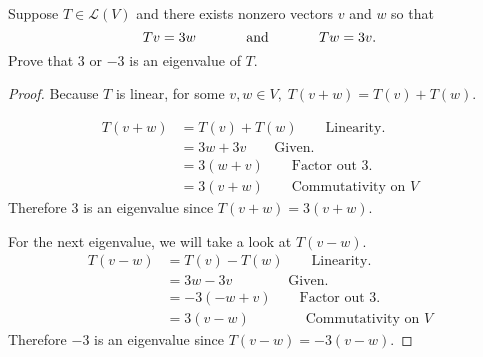 Suppose $T \in \mathcal{L}(V)$ and there exists nonzero vectors $v$ and $w$ so that
        \[
            Tv = 3w \hspace{.5in} \text{and} \hspace{.5in} Tw=3v.
        \]
        Prove that 3 or $-3$ is an eigenvalue of $T$.
\begin{mybox}
\begin{proof}
    Because $T$ is linear, for some $v,w \in V,\; T(v+w) = T(v) + T(w)$.

    \begin{align*}
        T(v+w) &= T(v) + T(w)\qquad \text{Linearity.}\\
        &= 3w + 3v \qquad \text{Given.}\\
        &= 3(w+v) \qquad \text{Factor out 3.}\\
        &= 3(v+w) \qquad \text{Commutativity on } V
    \end{align*}
    Therefore $3$ is an eigenvalue since $T(v+w) = 3(v+w)$.

    \nnl For the next eigenvalue, we will take a look at $T(v-w)$.
    \begin{align*}
        T(v-w) &= T(v) - T(w)\qquad \text{Linearity.}\\
        &= 3w - 3v \qquad\qquad \text{Given.}\\
        &= -3(-w+v) \qquad \text{Factor out 3.}\\
        &= 3(v-w) \qquad\qquad \text{Commutativity on } V
    \end{align*}
    Therefore $-3$ is an eigenvalue since $T(v-w) = -3(v-w)$.
\end{proof}
\end{mybox}